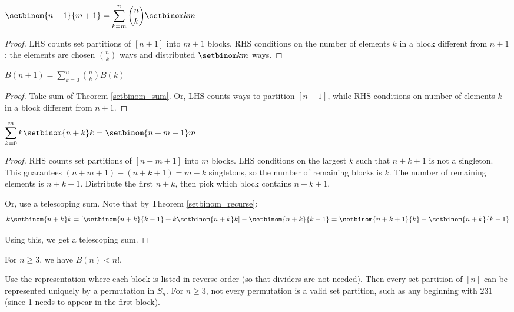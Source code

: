 \documentclass[a4paper]{article}
\begin{document}
\begin{theorem}\label{setbinom_sum}
$\setbinom{n+1}{m+1}=\displaystyle\sum_{k=m}^n\binom nk\setbinom km$

\begin{hl}
\begin{proof}
LHS counts set partitions of $[n+1]$ into $m+1$ blocks. RHS conditions on the number of elements $k$ in a block different from $n+1$; the elements are chosen $\binom nk$ ways and distributed $\setbinom km$ ways.
\end{proof}
\end{hl}
\end{theorem}

\begin{theorem}
$\displaystyle B(n+1)=\sum_{k=0}^n\binom nkB(k)$

\begin{hl}
\begin{proof}
Take sum of Theorem \ref{setbinom_sum}. Or, LHS counts ways to partition $[n+1]$, while RHS conditions on number of elements $k$ in a block different from $n+1$.
\end{proof}
\end{hl}
\end{theorem}

\begin{theorem}
$\displaystyle\sum_{k=0}^mk\setbinom{n+k}k=\setbinom{n+m+1}m$

\begin{hl}
\begin{proof}
RHS counts set partitions of $[n+m+1]$ into $m$ blocks. LHS conditions on the largest $k$ such that $n+k+1$ is not a singleton. This guarantees $(n+m+1)-(n+k+1)=m-k$ singletons, so the number of remaining blocks is $k$. The number of remaining elements is $n+k+1$. Distribute the first $n+k$, then pick which block contains $n+k+1$.

\medskip

Or, use a telescoping sum. Note that by Theorem \ref{setbinom_recurse}:
\begin{equation*}
k\setbinom{n+k}k=\left[\setbinom{n+k}{k-1}+k\setbinom{n+k}k\right]-\setbinom{n+k}{k-1}=\setbinom{n+k+1}{k}-\setbinom{n+k}{k-1}
\end{equation*}

Using this, we get a telescoping sum.
\end{proof}
\end{hl}
\end{theorem}

\begin{theorem}
For $n\geq3$, we have $B(n)<n!$.

\begin{hl}
Use the representation where each block is listed in reverse order (so that dividers are not needed). Then every set partition of $[n]$ can be represented uniquely by a permutation in $S_n$. For $n\geq3$, not every permutation is a valid set partition, such as any beginning with $231$ (since 1 needs to appear in the first block).
\end{hl}
\end{theorem}
\end{document}
